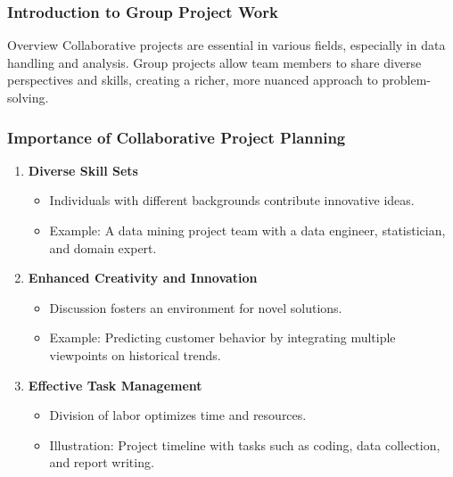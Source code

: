 \documentclass[aspectratio=169]{beamer}
\begin{document}
\frame{\titlepage}

\begin{frame}[fragile]
    \frametitle{Introduction to Group Project Work}
    \begin{block}{Overview}
        Collaborative projects are essential in various fields, especially in data handling and analysis. 
        Group projects allow team members to share diverse perspectives and skills, creating a richer, more nuanced approach to problem-solving.
    \end{block}
\end{frame}

\begin{frame}[fragile]
    \frametitle{Importance of Collaborative Project Planning}
    \begin{enumerate}
        \item \textbf{Diverse Skill Sets}
        \begin{itemize}
            \item Individuals with different backgrounds contribute innovative ideas.
            \item Example: A data mining project team with a data engineer, statistician, and domain expert.
        \end{itemize}
        
        \item \textbf{Enhanced Creativity and Innovation}
        \begin{itemize}
            \item Discussion fosters an environment for novel solutions.
            \item Example: Predicting customer behavior by integrating multiple viewpoints on historical trends.
        \end{itemize}
        
        \item \textbf{Effective Task Management}
        \begin{itemize}
            \item Division of labor optimizes time and resources.
            \item Illustration: Project timeline with tasks such as coding, data collection, and report writing.
        \end{itemize}
    \end{enumerate}
\end{frame}
\end{document}
